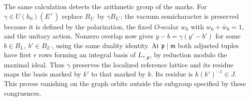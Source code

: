 The same calculation detects the arithmetic group of the marks.
For \(\gamma\in U(h_0)(E^+)\) replace \(B_{L'}\) by \(\gamma B_{L'}\);
the vacuum semicharacter is preserved because it is defined by the
polarization, the fixed \(O\)-scalar \(w_0\) with \(w_0+\bar w_0=1\),
and the unitary action. Nonzero overlap now gives
\(y-b=\gamma(y'-b')\) for some \(b\in B_L,\ b'\in B_{L'}\),
using the same duality identity. At \(\mathfrak p\mid\mathfrak m\)
both adjusted tuples have first \(r\) rows forming an integral
basis of \(L_{*,\mathfrak p}\), by reduction modulo the maximal
ideal. Thus \(\gamma\) preserves the localized reference lattice
and its residue maps the basis marked by \(k'\) to that marked by
\(k\). Its residue is \(k(k')^{-1}\in J\). This proves vanishing
on the graph orbits outside the subgroup specified by these
congruences.

